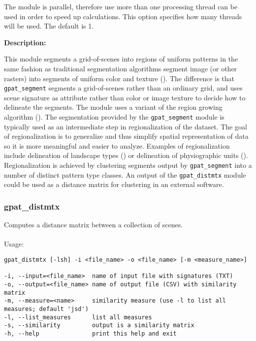 
The module is parallel, therefore use more than one processing thread can be used in order to speed up calculations. 
This option specifies how many threads will be used. 
The default is 1.

{\bf Description:}

This module segments a grid-of-scenes into regions of uniform patterns in the same fashion as traditional segmentation algorithms segment image (or other rasters) into segments of uniform color and texture (\cite{Niesterowicz2013}).
The difference is that {\tt gpat\_segment} segments a grid-of-scenes rather than an ordinary grid, and uses scene signature as attribute rather than color or image texture to decide how to delineate the segments. 
The module uses a variant of the region growing algorithm (\cite{Camara1996,Li2004c,Blaschke2010}).
The segmentation provided by the {\tt gpat\_segment} module is typically used as an intermediate step in regionalization of the
dataset. 
The goal of regionalization is to generalize and thus simplify spatial representation of data so it is more meaningful and
easier to analyze.
Examples of regionalization include delineation of landscape types  (\cite{Niesterowicz2013}) or delineation of physiographic units (\cite{Jasiewicz2014}).
Regionalization is achieved by clustering segments output by {\tt gpat\_segment} into a number of distinct pattern type classes.
An output of the {\tt gpat\_distmtx} module could be used as a distance matrix for clustering in an external software.

\subsubsection{gpat\_distmtx}
Computes a distance matrix between a collection of scenes.
\\\\
Usage:

\begin{minipage}{\linewidth}
\begin{lstlisting}
gpat_distmtx [-lsh] -i <file_name> -o <file_name> [-m <measure_name>]

-i, --input=<file_name>  name of input file with signatures (TXT)
-o, --output=<file_name> name of output file (CSV) with similarity matrix
-m, --measure=<name>     similarity measure (use -l to list all measures; default 'jsd')
-l, --list_measures      list all measures
-s, --similarity         output is a similarity matrix
-h, --help               print this help and exit
\end{lstlisting}
\end{minipage}

